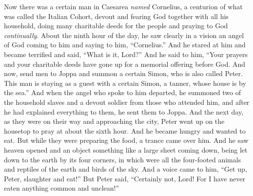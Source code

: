 \begin{biblechapter} %
 Now there was a certain man in Caesarea \textit{named} Cornelius, a centurion of what was called the Italian Cohort,
\verse devout and fearing God together with all his household, doing many charitable deeds for the people and praying to God \textit{continually}.
\verse About the ninth hour of the day, he saw clearly in a vision an angel of God coming to him and saying to him, “Cornelius.”
\verse And he stared at him and became terrified and said, “What is it, Lord?” And he said to him, “Your prayers and your charitable deeds have gone up for a memorial offering before God.
\verse And now, send men to Joppa and summon a certain Simon, who is also called Peter.
\verse This man is staying as a guest with a certain Simon, a tanner, whose house is by the sea.”
\verse And when the angel who spoke to him departed, he summoned two of the household slaves and a devout soldier from those who attended him,
\verse and after he had explained everything to them, he sent them to Joppa.
 And the next day, as they were on their way and approaching the city, Peter went up on the housetop to pray at about the sixth hour.
\verse And he became hungry and wanted to eat. But while they were preparing the food, a trance came over him.
\verse And he saw heaven opened and an object something like a large sheet coming down, being let down to the earth by its four corners,
\verse in which were all the four-footed animals and reptiles of the earth and birds of the sky.
\verse And a voice came to him, “Get up, Peter, slaughter and eat!”
\verse But Peter said, “Certainly not, Lord! For I have never eaten anything common and unclean!”

\end{biblechapter}
